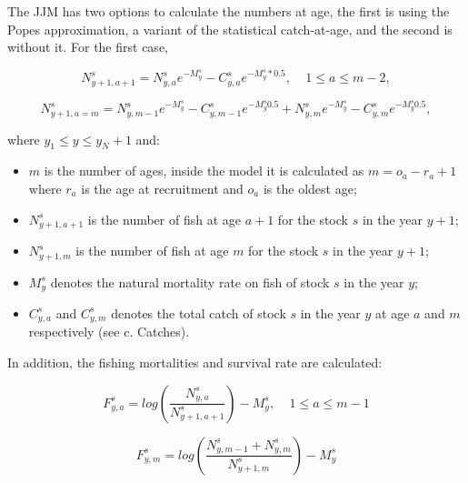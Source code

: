 \documentclass{article}
\begin{document}
The JJM has two options to calculate the numbers at age, the first is using the Popes approximation, a variant of the statistical catch-at-age, and the second is without it. For the first case,

\begin{equation}
N^{s}_{y+1,a+1}=N^s_{y,a}e^{-M^s_y}-C^s_{y,a}e^{-M^s_y*0.5}, \ \ \ \ \ 1\leq a \leq m-2,
\end{equation}
    
\begin{equation}
N^s_{y+1,a=m}=N^s_{y,m-1}e^{-M^s_y}-C^s_{y,m-1}e^{-M^s_y 0.5}+N^s_{y,m}e^{-M^s_y}-C^s_{y,m}e^{-M^s_y 0.5}, 
\end{equation}

where $y_1\leq y \leq y_N+1$ and:
\begin{itemize}
    \item $m$ is the number of ages, inside the model it is calculated as $m=o_a-r_a+1$ where $r_a$ is the age at recruitment and $o_a$ is the oldest age;
    
    \item $N^{s}_{y+1,a+1}$ is the number of fish at age $a+1$ for the stock $s$ in the year $y+1$;

    \item $N^{s}_{y+1,m}$ is the number of fish at age $m$ for the stock $s$ in the year $y+1$;

    \item $M^{s}_{y}$ denotes the natural mortality rate on fish of stock $s$ in the year $y$;

    \item $C^s_{y,a}$ and $C^s_{y,m}$ denotes the total catch of stock $s$ in the year $y$ at age $a$ and $m$ respectively (see c. Catches).
    
\end{itemize}

\hfill

In addition, the fishing mortalities and survival rate are calculated:

\begin{equation} \label{eq: fs}
F^s_{y,a}=log\left(\dfrac{N^s_{y,a}}{N^s_{y+1,a+1}}\right)-M^s_y, \ \ \ \ \ 1\leq a \leq m-1
\end{equation}

\begin{equation}
F^s_{y,m}=log\left(\dfrac{N^s_{y,m-1}+N^s_{y,m}}{N^s_{y+1,m}}\right)-M^s_y
\end{equation}
\end{document}
